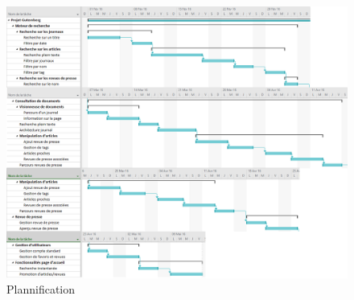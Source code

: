 	\begin{figure}[H]
        \centering
        \includegraphics[width=1.3\textwidth, angle=90]{figures/plan.png}
            \caption{Plannification}
            \label{fig:plan_recherche}
    \end{figure}